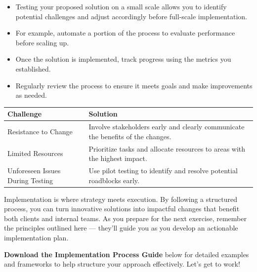 \documentclass[11pt]{article}
\begin{document}
\begin{itemize}[leftmargin=1.5em, itemsep=2pt]
  \item Testing your proposed solution on a small scale allows you to identify
  potential challenges and adjust accordingly before full-scale
  implementation.
  \item For example, automate a portion of the process to evaluate performance
  before scaling up.
\end{itemize}

\begin{itemize}[leftmargin=1.5em, itemsep=2pt]
  \item Once the solution is implemented, track progress using the metrics you
  established.
  \item Regularly review the process to ensure it meets goals and make
  improvements as needed.
\end{itemize}

\begin{center}
\begin{tabular}{@{}p{5cm}p{11cm}@{}}
  \toprule
  \textbf{Challenge} & \textbf{Solution} \\
  \midrule
  Resistance to Change & Involve stakeholders early and clearly communicate
    the benefits of the changes. \\
  Limited Resources & Prioritize tasks and allocate resources to areas with
    the highest impact. \\
  Unforeseen Issues During Testing & Use pilot testing to identify and resolve
    potential roadblocks early. \\
  \bottomrule
\end{tabular}
\end{center}

Implementation is where strategy meets execution. By following a structured
process, you can turn innovative solutions into impactful changes that benefit
both clients and internal teams. As you prepare for the next exercise,
remember the principles outlined here --- they'll guide you as you develop an
actionable implementation plan.

\textbf{Download the Implementation Process Guide} below for detailed examples
and frameworks to help structure your approach effectively. Let's get to
work!\par\medskip

\end{document}
